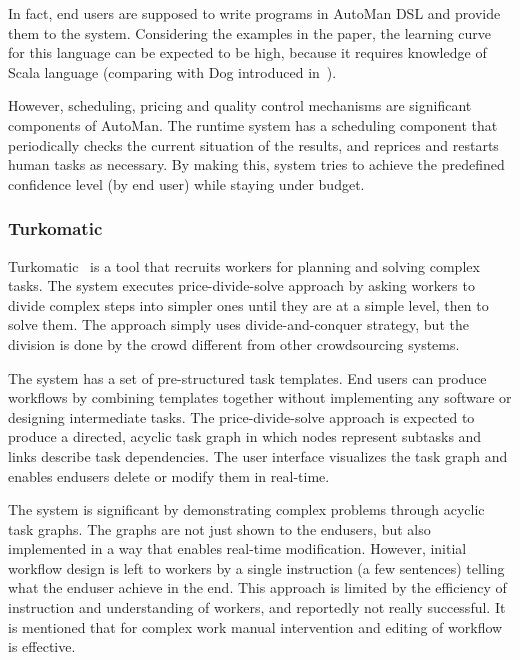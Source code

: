 In fact, end users are supposed to write programs in AutoMan DSL and provide 
them to the system. Considering the examples in the paper, the learning curve 
for this language can be expected to be high, because it requires knowledge 
of Scala language (comparing with Dog introduced in~\cite{Ahmad2011}).

However, scheduling, pricing and quality control mechanisms are significant 
components of AutoMan. The runtime system has a scheduling component that 
periodically checks the current situation of the results, and reprices and restarts 
human tasks as necessary. By making this, system tries to achieve the predefined 
confidence level (by end user) while staying under budget.


\subsubsection{Turkomatic}
Turkomatic~\cite{Kulkarni2012} is a tool that recruits workers for planning and 
solving complex tasks. The system executes price-divide-solve approach by 
asking workers to divide complex steps into simpler ones until they are at a simple 
level, then to solve them. The approach simply uses divide-and-conquer strategy, 
but the division is done by the crowd different from other crowdsourcing systems.

The system has a set of pre-structured task templates. End users can produce 
workflows by combining templates together without implementing any software 
or designing intermediate tasks. The price-divide-solve approach is expected 
to produce a directed, acyclic task graph in which nodes represent subtasks and 
links describe task dependencies. The user interface visualizes the task graph 
and enables endusers delete or modify them in real-time.

The system is significant by demonstrating complex problems through acyclic 
task graphs. The graphs are not just shown to the endusers, but also implemented 
in a way that enables real-time modification. However, initial workflow design 
is left to workers by a single instruction (a few sentences) telling what the enduser 
achieve in the end. This approach is limited by the efficiency of instruction and 
understanding of workers, and reportedly not really successful. It is mentioned 
that for complex work manual intervention and editing of workflow is effective.

